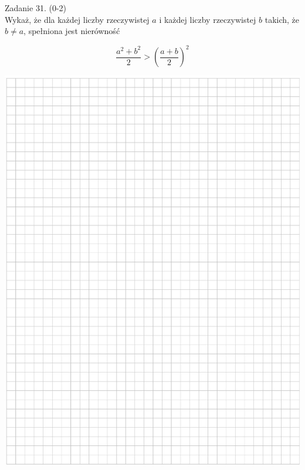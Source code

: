 \documentclass[10pt]{article}
\begin{document}
Zadanie 31. (0-2)\\
Wykaż, że dla każdej liczby rzeczywistej \(a\) i każdej liczby rzeczywistej \(b\) takich, że \(b \neq a\), spełniona jest nierówność

\[
\frac{a^{2}+b^{2}}{2}>\left(\frac{a+b}{2}\right)^{2}
\]

\begin{center}
\includegraphics[max width=\textwidth]{2024_11_21_465acd0c12fa3e05e8a7g-18}
\end{center}
\end{document}
